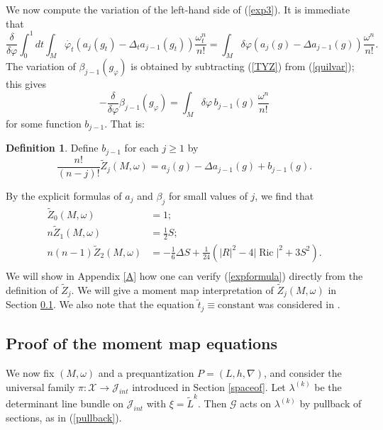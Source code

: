 \documentclass[12pt,reqno,a4paper]{amsart}
\numberwithin{equation}{section}
\DeclareMathOperator{\ric}{Ric}
\theoremstyle{definition}
\newtheorem{definition}{Definition}
\theoremstyle{remark}
\begin{document}
We now compute the variation of the left-hand side of (\ref{exp3}). It is immediate that
\begin{equation}\label{TYZ}
\frac{\delta}{\delta\varphi} \int_0^1 dt\int_M \dot{\varphi_t}(a_{j}(g_t)-\Delta_t a_{j-1}(g_t))\frac{\omega_t^n}{n!}=\int_M \delta\varphi(a_{j}(g)-\Delta a_{j-1}(g))\frac{\omega^n}{n!}.
\end{equation}
The variation of $\beta_{j-1}(g_\varphi)$ is obtained by subtracting (\ref{TYZ}) from (\ref{quilvar}); this gives
\begin{equation}\label{torvar}
-\frac{\delta}{\delta\varphi} \beta_{j-1}(g_\varphi)=\int_M \delta\varphi\, b_{j-1}(g) \,\frac{\omega^n}{n!}
\end{equation}
for some function $b_{j-1}$.
That is:
\begin{definition}
Define $b_{j-1}$ for each $j\geq 1$ by
\begin{equation*}
\frac{n!}{(n-j)!}\widetilde{Z}_j(M,\omega)=a_j(g)-\Delta a_{j-1}(g)+b_{j-1}(g).
\end{equation*}
\end{definition}
By the explicit formulas of $a_j$ \cite{lu2000lower} and $\beta_j$ \cite{vasserot1989asymptotics,finski2018full} for small values of $j$, we find that
\begin{equation}
\begin{aligned}
\widetilde{Z}_0(M,\omega) &= 1;\\
n\widetilde{Z}_1(M,\omega) &= \frac12 S;\\
n(n-1)\widetilde{Z}_2(M,\omega) &= -\frac{1}{6} \Delta S + \frac{1}{24}(|R|^2-4|\ric|^2+3S^2).\label{expformula}\\
\end{aligned}
\end{equation}
We will show in Appendix \ref{A} how one can verify (\ref{expformula}) directly from the definition of $\widetilde{Z}_j$. We will give a moment map interpretation of $\widetilde{Z}_j(M,\omega)$ in Section \ref{momentproof}. We also note that the equation $\widetilde{t}_j\equiv \mathrm{constant}$ was considered in \cite{leung1998bando}.


\subsection{Proof of the moment map equations}\label{momentproof}

We now fix $(M,\omega)$ and a prequantization $P=(L,h,\nabla)$, and consider the universal family $\pi : \mathcal{X}\rightarrow \mathcal{J}_{int}$ introduced in Section \ref{spaceof}. Let $\lambda^{(k)}$ be the determinant line bundle on $\mathcal{J}_{int}$ with $\xi=\widetilde{L}^k$. Then $\mathcal{G}$ acts on $\lambda^{(k)}$ by pullback of sections, as in (\ref{pullback}).
\end{document}
